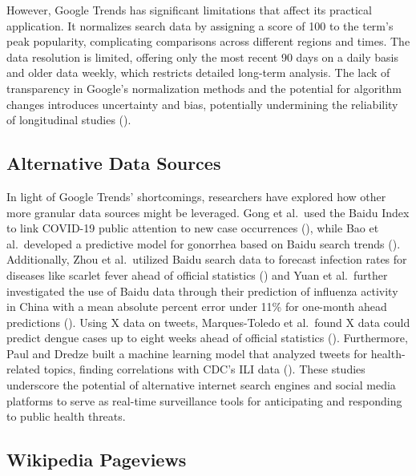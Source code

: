 \documentclass[
  12pt,
]{article}
\begin{document}
However, Google Trends has significant limitations that affect its
practical application. It normalizes search data by assigning a score of
100 to the term's peak popularity, complicating comparisons across
different regions and times. The data resolution is limited, offering
only the most recent 90 days on a daily basis and older data weekly,
which restricts detailed long-term analysis. The lack of transparency in
Google's normalization methods and the potential for algorithm changes
introduces uncertainty and bias, potentially undermining the reliability
of longitudinal studies ().

\subsection{Alternative Data Sources}\label{alternative-data-sources}

In light of Google Trends' shortcomings, researchers have explored how
other more granular data sources might be leveraged. Gong et al.~used
the Baidu Index to link COVID-19 public attention to new case
occurrences (), while Bao et
al.~developed a predictive model for gonorrhea based on Baidu search
trends (). Additionally, Zhou et
al.~utilized Baidu search data to forecast infection rates for diseases
like scarlet fever ahead of official statistics
() and Yuan et al.~further
investigated the use of Baidu data through their prediction of influenza
activity in China with a mean absolute percent error under 11\% for
one-month ahead predictions (). Using X data on tweets, Marques-Toledo et al.~found X data could
predict dengue cases up to eight weeks ahead of official statistics
().
Furthermore, Paul and Dredze built a machine learning model that
analyzed tweets for health-related topics, finding correlations with
CDC's ILI data (). These
studies underscore the potential of alternative internet search engines
and social media platforms to serve as real-time surveillance tools for
anticipating and responding to public health threats.

\subsection{Wikipedia Pageviews}\label{wikipedia-pageviews}
\end{document}
